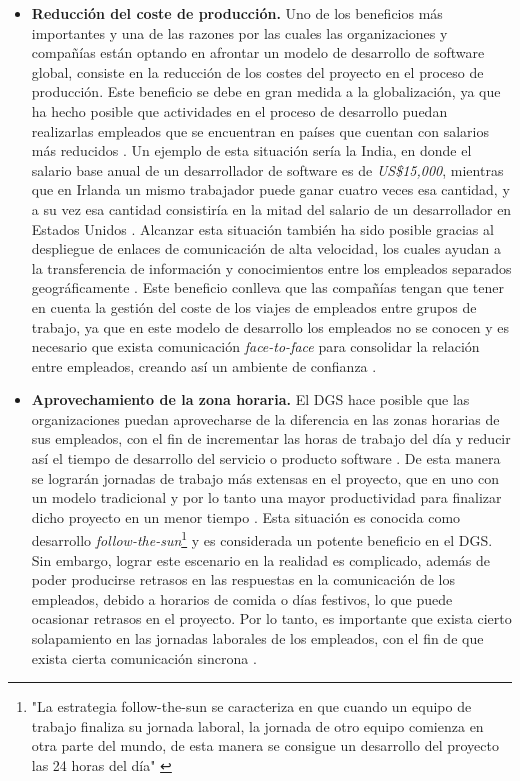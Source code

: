 \begin{itemize}
	\item \textbf{Reducción del coste de producción.} Uno de los beneficios más importantes y una de las razones por las cuales las organizaciones y compañías están optando en afrontar un modelo de desarrollo de software global, consiste en la reducción de los costes del proyecto en el proceso de producción. Este beneficio se debe en gran medida a la globalización, ya que ha hecho posible que actividades en el proceso de desarrollo puedan realizarlas empleados que se encuentran en países que cuentan con salarios más reducidos \cite{aagerfalk2008benefits}. Un ejemplo de esta situación sería la India, en donde el salario base anual de un desarrollador de software es de \emph{US\$15,000}, mientras que en Irlanda un mismo trabajador puede ganar cuatro veces esa cantidad, y a su vez esa cantidad consistiría en la mitad del salario de un desarrollador en Estados Unidos \cite{conchuir2009global, conchuir2006exploring}. Alcanzar esta situación también ha sido posible gracias al despliegue de enlaces de comunicación de alta velocidad, los cuales ayudan a la transferencia de información y conocimientos entre los empleados separados geográficamente \cite{aagerfalk2008benefits}. Este beneficio conlleva que las compañías tengan que tener en cuenta la gestión del coste de los viajes de empleados entre grupos de trabajo, ya que en este modelo de desarrollo los empleados no se conocen y es necesario que exista comunicación \emph{face-to-face} para consolidar la relación entre empleados, creando así un ambiente de confianza \cite{conchuir2009global, conchuir2006exploring}.
	
	\item \textbf{Aprovechamiento de la zona horaria.} El DGS hace posible que las organizaciones puedan aprovecharse de la diferencia en las zonas horarias de sus empleados, con el fin de incrementar las horas de trabajo del día y reducir así el tiempo de desarrollo del servicio o producto software \cite{conchuir2006exploring, conchuir2009global}. De esta manera se lograrán jornadas de trabajo más extensas en el proyecto, que en uno con un modelo tradicional y por lo tanto una mayor productividad para finalizar dicho proyecto en un menor tiempo \cite{vizcaino2015vision}. Esta situación es conocida como desarrollo \emph{follow-the-sun}\footnote{"La estrategia follow-the-sun se caracteriza en que cuando un equipo de trabajo finaliza su jornada laboral, la jornada de otro equipo comienza en otra parte del mundo, de esta manera se consigue un desarrollo del proyecto las 24 horas del día" \cite{piattini2014desarrollo}} y es considerada un potente beneficio en el DGS. Sin embargo, lograr este escenario en la realidad es complicado, además de poder producirse retrasos en las respuestas en la comunicación de los empleados, debido a horarios de comida o días festivos, lo que puede ocasionar retrasos en el proyecto. Por lo tanto, es importante que exista cierto solapamiento en las jornadas laborales de los empleados, con el fin de que exista cierta comunicación sincrona \cite{conchuir2006exploring, conchuir2009global}.
	

\end{itemize}
